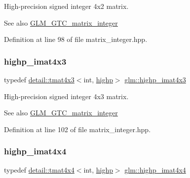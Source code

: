 High-\/precision signed integer 4x2 matrix. \begin{DoxySeeAlso}{See also}
\hyperlink{group__gtc__matrix__integer}{G\+L\+M\+\_\+\+G\+T\+C\+\_\+matrix\+\_\+integer} 
\end{DoxySeeAlso}


Definition at line 98 of file matrix\+\_\+integer.\+hpp.

\mbox{\label{group__gtc__matrix__integer_ga9d51b6f1c8cd0b23c6fcc8dca924b14c}} 
\subsubsection{\texorpdfstring{highp\+\_\+imat4x3}{highp\_imat4x3}}
{\footnotesize\ttfamily typedef \hyperlink{structglm_1_1detail_1_1tmat4x3}{detail\+::tmat4x3}$<$int, \hyperlink{namespaceglm_a0f04f086094c747d227af4425893f545ac6f7eab42eacbb10d59a58e95e362074}{highp}$>$ \hyperlink{group__gtc__matrix__integer_ga9d51b6f1c8cd0b23c6fcc8dca924b14c}{glm\+::highp\+\_\+imat4x3}}

High-\/precision signed integer 4x3 matrix. \begin{DoxySeeAlso}{See also}
\hyperlink{group__gtc__matrix__integer}{G\+L\+M\+\_\+\+G\+T\+C\+\_\+matrix\+\_\+integer} 
\end{DoxySeeAlso}


Definition at line 102 of file matrix\+\_\+integer.\+hpp.

\mbox{\label{group__gtc__matrix__integer_ga969c88d5c7530beb80768205a054ee80}} 
\subsubsection{\texorpdfstring{highp\+\_\+imat4x4}{highp\_imat4x4}}
{\footnotesize\ttfamily typedef \hyperlink{structglm_1_1detail_1_1tmat4x4}{detail\+::tmat4x4}$<$int, \hyperlink{namespaceglm_a0f04f086094c747d227af4425893f545ac6f7eab42eacbb10d59a58e95e362074}{highp}$>$ \hyperlink{group__gtc__matrix__integer_ga969c88d5c7530beb80768205a054ee80}{glm\+::highp\+\_\+imat4x4}}

